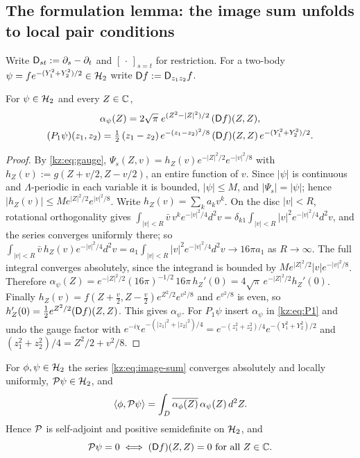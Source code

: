 \subsection{The formulation lemma: the image sum unfolds to local pair conditions}\label{kz:sec:A}

Write $\mathsf{D}_{st}:=\partial_s-\partial_t$ and $[\,\cdot\,]_{s=t}$ for restriction. For a
two-body $\psi=fe^{-(Y_1^2+Y_2^2)/2}\in\mathcal{H}_2$ write $\mathsf{D} f:=\mathsf{D}_{z_1z_2}f$.

\begin{lemma}[the $m=1$ amplitude]\label{kz:lem:A1}
For $\psi\in\mathcal{H}_2$ and every $Z\in\mathbb{C}$,
\begin{gather*}
\alpha_\psi(Z)=2\sqrt\pi\;e^{(Z^2-|Z|^2)/2}\,(\mathsf{D} f)(Z,Z),\\
(P_1\psi)(z_1,z_2)=\tfrac12\,(z_1-z_2)\,e^{-(z_1-z_2)^2/8}\,(\mathsf{D} f)(Z,Z)\,e^{-(Y_1^2+Y_2^2)/2}.
\end{gather*}
\end{lemma}

\begin{proof}
By \eqref{kz:eq:gauge}, $\Psi_s(Z,v)=h_Z(v)e^{-|Z|^2/2}e^{-|v|^2/8}$ with $h_Z(v):=g(Z+v/2,Z-v/2)$, an
entire function of $v$. Since $|\psi|$ is continuous and $\Lambda$-periodic in each variable it is
bounded, $|\psi|\le M$, and $|\Psi_s|=|\psi|$; hence $|h_Z(v)|\le Me^{|Z|^2/2}e^{|v|^2/8}$. Write
$h_Z(v)=\sum_ka_kv^k$. On the disc $|v|<R$, rotational orthogonality gives
$\int_{|v|<R}\bar v\,v^ke^{-|v|^2/4}d^2v=\delta_{k1}\int_{|v|<R}|v|^2e^{-|v|^2/4}d^2v$, and the series
converges uniformly there; so
$\int_{|v|<R}\bar v\,h_Z(v)e^{-|v|^2/4}d^2v=a_1\int_{|v|<R}|v|^2e^{-|v|^2/4}d^2v\to16\pi a_1$ as $R\to\infty$.
The full integral converges absolutely, since the integrand is bounded by
$Me^{|Z|^2/2}|v|e^{-|v|^2/8}$. Therefore
$\alpha_\psi(Z)=e^{-|Z|^2/2}(16\pi)^{-1/2}\,16\pi\,h_Z'(0)=4\sqrt\pi\,e^{-|Z|^2/2}h_Z'(0)$. Finally
$h_Z(v)=f(Z+\tfrac v2,Z-\tfrac v2)e^{Z^2/2}e^{v^2/8}$ and $e^{v^2/8}$ is even, so
$h_Z'(0)=\tfrac12e^{Z^2/2}(\mathsf{D} f)(Z,Z)$. This gives $\alpha_\psi$. For $P_1\psi$ insert $\alpha_\psi$ in
\eqref{kz:eq:P1} and undo the gauge factor with $e^{-i\chi}e^{-(|z_1|^2+|z_2|^2)/4}=e^{-(z_1^2+z_2^2)/4}e^{-(Y_1^2+Y_2^2)/2}$
and $(z_1^2+z_2^2)/4=Z^2/2+v^2/8$.
\end{proof}

\begin{lemma}[unfolding]\label{kz:lem:A2}
For $\phi,\psi\in\mathcal{H}_2$ the series \eqref{kz:eq:image-sum} converges absolutely and locally uniformly,
$\mathcal{P}\psi\in\mathcal{H}_2$, and
\[
\langle\phi,\mathcal{P}\psi\rangle=\int_D\overline{\alpha_\phi(Z)}\,\alpha_\psi(Z)\,d^2Z .
\]
Hence $\mathcal{P}$ is self-adjoint and positive semidefinite on $\mathcal{H}_2$, and
\[
\kzP\psi=0\iff(\kzD f)(Z,Z)=0\ \text{for all }Z\in\C .
\]
\end{lemma}

